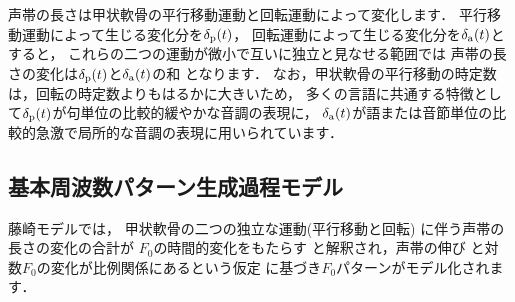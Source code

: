 声帯の長さは甲状軟骨の平行移動運動と回転運動によって変化します．
平行移動運動によって生じる変化分を$\delta_{\rm p}(t)$，
回転運動によって生じる変化分を$\delta_{\rm a}(t)$とすると，
これらの二つの運動が微小で互いに独立と見なせる範囲では
声帯の長さの変化は$\delta_{\rm p}(t)$と$\delta_{\rm a}(t)$の和
となります．
なお，甲状軟骨の平行移動の時定数は，回転の時定数よりもはるかに大きいため，
多くの言語に共通する特徴として$\delta_{\rm p}(t)$が句単位の比較的緩やかな音調の表現に，
$\delta_{\rm a}(t)$が語または音節単位の比較的急激で局所的な音調の表現に用いられています．


\subsection{基本周波数パターン生成過程モデル\cite{Fujisaki1988}}
\label{subsec:OriginalFujisakiModel}

藤崎モデルでは，
甲状軟骨の二つの独立な運動(平行移動と回転)
に伴う声帯の長さの変化の合計が
$F_0$の時間的変化をもたらす
と解釈され，声帯の伸び
と対数$F_0$の変化が比例関係にあるという仮定
に基づき$F_0$パターンがモデル化されます．


